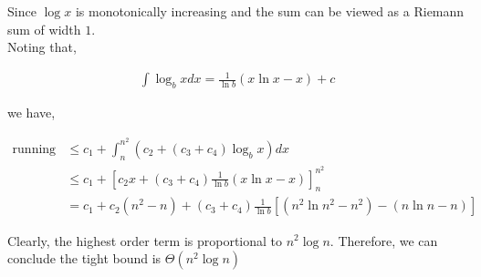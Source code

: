 \begin{enumerate}
          Since $\log{x}$ is monotonically increasing and the sum can be viewed as a Riemann sum of width $1$. \\

          Noting that,

          \begin{align*}
              \int \log_b{x} dx = \frac{1}{\ln{b}} \left( x\ln{x} - x \right) + c
          \end{align*}

          we have,

          \begin{align*}
              \text{running time} & \le c_1 + \int_{n}^{n^2} \left( c_2 + \left( c_3 + c_4 \right) \log_b{x} \right) dx                                                                          \\
                                  & \le c_1 + \left[ c_2 x + \left( c_3 + c_4 \right) \frac{1}{\ln{b}} \left( x\ln{x} - x \right) \right]_n^{n^2}                                                \\
                                  & =  c_1 + c_2 \left( n^2 - n \right) + \left( c_3 + c_4 \right) \frac{1}{\ln{b}} \left[ \left( n^2\ln{n^2} - n^2 \right) - \left( n\ln{n} - n \right) \right]
          \end{align*}

          Clearly, the highest order term is proportional to $n^2 \log{n}$. Therefore, we can conclude the tight
          bound is $\Theta\left(n^2 \log{n}\right)$

\end{enumerate}